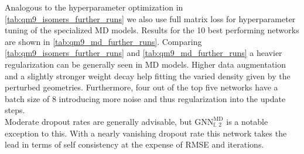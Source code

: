\begin{table}[h]
    \centering
    \caption[GNN predictions on QM9  isomer MD]{GNN predictions on the QM9  isomer MD test set. With MD-retrained\footnote{models marked with a $*$ are architectures from another dataset retrained on the current one} versions of $\text{GNN}_\text{initial}$ and $\text{GNN}_\text{f. 0}$.}
    \label{tab:qm9_md_last_best_retrain}
\end{table}
Analogous to the hyperparameter optimization in \autoref{tab:qm9_isomers_further_runs} we also use full matrix loss for hyperparameter tuning of the specialized MD models. Results for the 10 best performing networks are shown in \autoref{tab:qm9_md_further_runs}. Comparing \autoref{tab:qm9_isomers_further_runs} and \autoref{tab:qm9_md_further_runs} a heavier regularization can be generally seen in MD models. Higher data augmentation and a slightly stronger weight decay help fitting the varied density given by the perturbed geometries. Furthermore, four out of the top five networks have a batch size of 8 introducing more noise and thus regularization into the update steps. \\
Moderate dropout rates are generally advisable, but $\text{GNN}^{\text{MD}}_\text{f. 2}$ is a notable exception to this. With a nearly vanishing dropout rate this network takes the lead in terms of self consistency at the expense of RMSE and iterations. 
